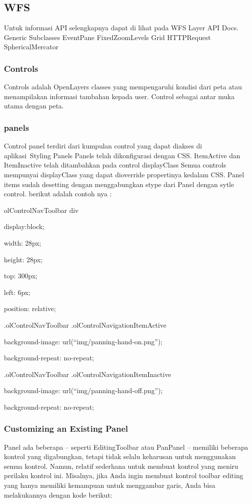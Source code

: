 \documentclass{article}
\begin{document}
\subsection {WFS}
Untuk informasi API selengkapnya dapat di lihat pada WFS Layer API Docs.
Generic Subclasses
EventPane
FixedZoomLevels
Grid
HTTPRequest
SphericalMercator

\subsubsection {Controls}
Controls adalah OpenLayers classes yang mempengaruhi kondisi dari peta atau menampilakan informasi tambahan kepada user. Control sebagai antar muka utama dengan peta.

\subsubsection {panels}
Control panel terdiri dari kumpulan control yang dapat diakses di aplikasi Styling Panels
Panels telah dikonfigurasi dengan CSS. ItemActive dan ItemInactive telah ditambahkan pada control displayClass
Semua controls mempunyai displayClass yang dapat dioverride propertinya kedalam CSS. Panel items sudah desetting dengan menggabungkan stype dari Panel dengan sytle control. berikut adalah contoh nya :

olControlNavToolbar div {

display:block;

width: 28px;

height: 28px;

top: 300px;

left: 6px;

position: relative;

}

.olControlNavToolbar .olControlNavigationItemActive {

background-image: url(“img/panning-hand-on.png”);

background-repeat: no-repeat;

}

.olControlNavToolbar .olControlNavigationItemInactive {

background-image: url(“img/panning-hand-off.png”);

background-repeat: no-repeat;

}

\subsubsection {Customizing an Existing Panel}
Panel ada beberapa – seperti EditingToolbar atau PanPanel – memiliki beberapa kontrol yang digabungkan, tetapi tidak selalu keharusan untuk menggunakan semua kontrol. Namun, relatif sederhana untuk membuat kontrol yang meniru perilaku kontrol ini. Misalnya, jika Anda ingin membuat kontrol toolbar editing yang hanya memiliki kemampuan untuk menggambar garis, Anda bisa melakukannya dengan kode berikut:
\end{document}

